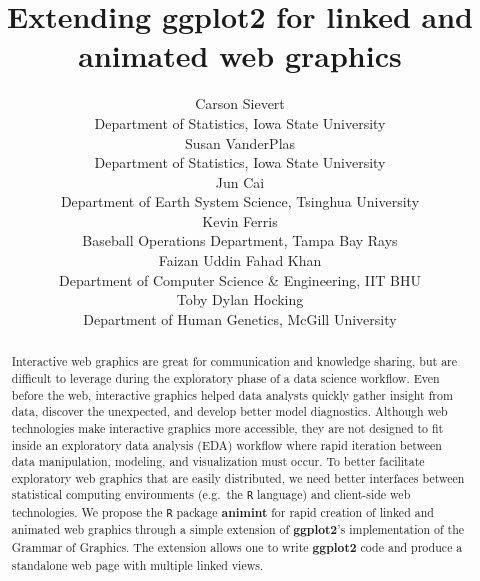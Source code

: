 \documentclass[12pt,]{article}
\theoremstyle{definition}
\theoremstyle{definition}
\theoremstyle{definition}
\theoremstyle{remark}
\begin{document}
\def\spacingset#1{\renewcommand{\baselinestretch}%
{#1}\small\normalsize} \spacingset{1}

\title{\bf Extending ggplot2 for linked and animated web graphics}
\author{
  Carson Sievert \\ 
  Department of Statistics, Iowa State University \\
  Susan VanderPlas \\
  Department of Statistics, Iowa State University \\
  Jun Cai \\
  Department of Earth System Science, Tsinghua University\\
  Kevin Ferris \\
  Baseball Operations Department, Tampa Bay Rays \\
  Faizan Uddin Fahad Khan \\
  Department of Computer Science \& Engineering, IIT BHU \\
  Toby Dylan Hocking \\ 
  Department of Human Genetics, McGill University \\
}
\maketitle

\bigskip
\begin{abstract}
Interactive web graphics are great for communication and knowledge
sharing, but are difficult to leverage during the exploratory phase of a
data science workflow. Even before the web, interactive graphics helped
data analysts quickly gather insight from data, discover the unexpected,
and develop better model diagnostics. Although web technologies make
interactive graphics more accessible, they are not designed to fit
inside an exploratory data analysis (EDA) workflow where rapid iteration
between data manipulation, modeling, and visualization must occur. To
better facilitate exploratory web graphics that are easily distributed,
we need better interfaces between statistical computing environments
(e.g.~the \texttt{R} language) and client-side web technologies. We
propose the \texttt{R} package \textbf{animint} for rapid creation of
linked and animated web graphics through a simple extension of
\textbf{ggplot2}'s implementation of the Grammar of Graphics. The
extension allows one to write \textbf{ggplot2} code and produce a
standalone web page with multiple linked views.
\end{abstract}
\end{document}
